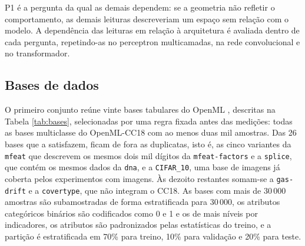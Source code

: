 P1 é a pergunta da qual as demais dependem: se a geometria não refletir o comportamento, as demais leituras descreveriam um espaço sem relação com o modelo. A dependência das leituras em relação à arquitetura é avaliada dentro de cada pergunta, repetindo-as no perceptron multicamadas, na rede convolucional e no transformador.

\subsection{Bases de dados}\label{subsec:dados}

O primeiro conjunto reúne vinte bases tabulares do OpenML \citep{Vanschoren2014}, descritas na Tabela \ref{tab:bases}, selecionadas por uma regra fixada antes das medições: todas as bases multiclasse do OpenML-CC18 \citep{Bischl2021} com ao menos duas mil amostras. Das 26 bases que a satisfazem, ficam de fora as duplicatas, isto é, as cinco variantes da \texttt{mfeat} que descrevem os mesmos dois mil dígitos da \texttt{mfeat-factors} e a \texttt{splice}, que contém os mesmos dados da \texttt{dna}, e a \texttt{CIFAR\_10}, uma base de imagens já coberta pelos experimentos com imagens. Às dezoito restantes somam-se a \texttt{gas-drift} e a \texttt{covertype}, que não integram o CC18. As bases com mais de 30\,000 amostras são subamostradas de forma estratificada para 30\,000, os atributos categóricos binários são codificados como 0 e 1 e os de mais níveis por indicadores, os atributos são padronizados pelas estatísticas do treino, e a partição é estratificada em 70\% para treino, 10\% para validação e 20\% para teste.

